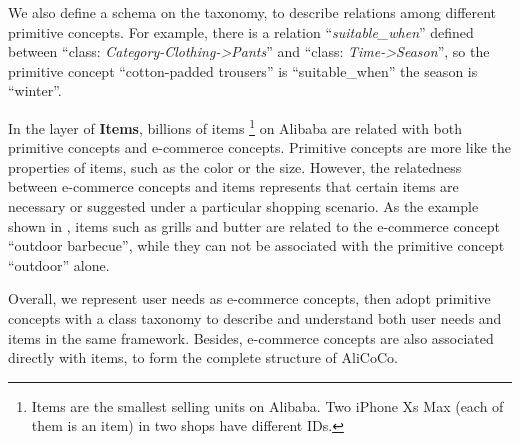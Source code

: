 We also define a schema on the taxonomy, 
to describe relations among different primitive concepts. For example, there is a relation ``\textit{suitable\_when}'' defined between ``class:\textit{ Category-Clothing->Pants}'' and ``class: \textit{Time->Season}'', so the primitive concept ``cotton-padded trousers'' is ``suitable\_when'' the season is ``winter''. 

In the layer of \textbf{Items}, billions of items \footnote{Items are the smallest selling units on Alibaba. Two iPhone Xs Max (each of them is an item) in two shops have different IDs.} on Alibaba are related with both primitive concepts and e-commerce concepts.
Primitive concepts are more like the properties of 
items, such as the color or the size.
However, the relatedness between e-commerce concepts and items represents that certain items are necessary or suggested under a particular shopping scenario. 
As the example shown in ,
items such as grills and butter are related to the e-commerce concept ``outdoor barbecue'', 
while they can not be associated with the primitive concept ``outdoor'' alone.

Overall, we represent user needs as e-commerce concepts, then adopt primitive concepts with a class taxonomy to describe and understand both user needs and items in the same framework. 
Besides, e-commerce concepts are also associated directly with items, to form the complete structure of AliCoCo.







